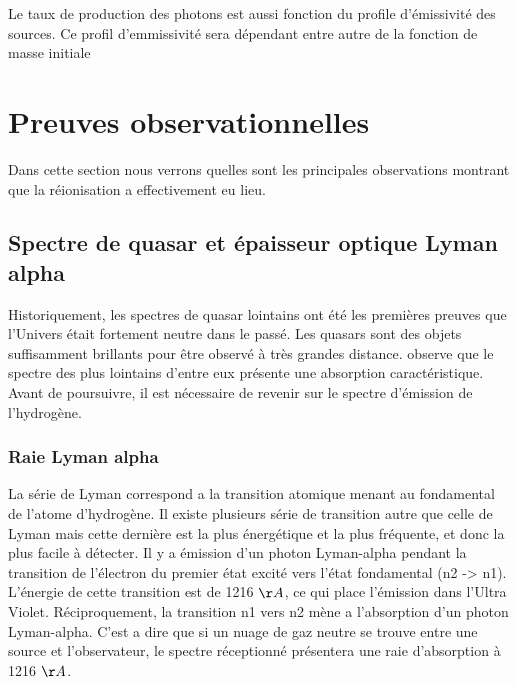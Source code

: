 Le taux de production des photons est aussi fonction du profile d'émissivité des sources.
Ce profil d'emmissivité sera dépendant entre autre de la fonction de masse initiale


\clearpage
\section{Preuves observationnelles}
\label{sec_contraintes_obs}

Dans cette section nous verrons quelles sont les principales observations montrant que la réionisation a effectivement eu lieu.

\subsection{Spectre de quasar et épaisseur optique Lyman alpha}

Historiquement, les spectres de quasar lointains ont été les premières preuves que l'Univers était fortement neutre dans le passé.
Les quasars sont des objets suffisamment brillants pour être observé à très grandes distance.
\cite{1965ApJ...141.1295S} observe que le spectre des plus lointains d'entre eux présente une absorption caractéristique.%
Avant de poursuivre, il est nécessaire  de revenir sur le spectre d’émission de l’hydrogène.

\subsubsection*{Raie Lyman alpha}


La série de Lyman correspond a la transition atomique menant au fondamental de l'atome d'hydrogène.
Il existe plusieurs série de transition autre que celle de Lyman mais cette dernière est la plus énergétique et la plus fréquente, et donc la plus facile à détecter.
Il y a émission d'un photon Lyman-alpha pendant la transition de l'électron du premier état excité vers l’état fondamental (n2 -> n1).
L'énergie de cette transition est de 1216 $\AA$,  ce qui place l’émission dans l'Ultra Violet.
Réciproquement, la transition n1 vers n2 mène a l'absorption d'un photon Lyman-alpha.
C'est a dire que si un nuage de gaz neutre se trouve entre une source et l'observateur, le spectre réceptionné présentera une raie d'absorption à 1216 $\AA$.

